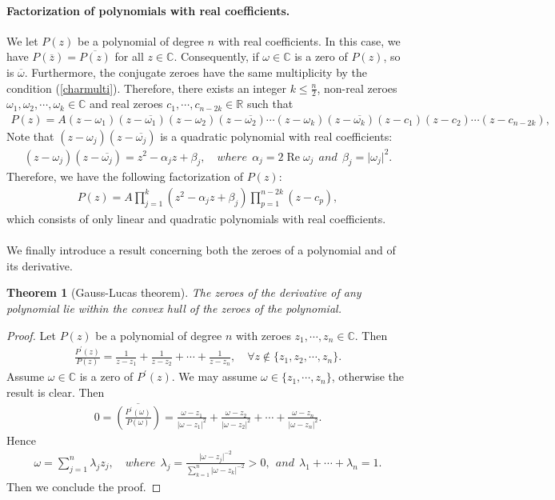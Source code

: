 \documentclass{article}
\numberwithin{equation}{section}
\newcommand{\bbC}{\mathbb{C}}
\newcommand{\bbR}{\mathbb{R}}
\newcommand{\ol}{\overline}
\DeclareMathOperator{\re}{Re}
\theoremstyle{plain}
\newtheorem{theorem}{Theorem}[section]
\theoremstyle{definition}
\begin{document}
\paragraph{Factorization of polynomials with real coefficients.} We let $P(z)$ be a polynomial of degree $n$ with real coefficients. In this case, we have $P(\ol{z})=\ol{P(z)}$ for all $z\in\bbC$. Consequently, if $\omega\in\bbC$ is a zero of $P(z)$, so is $\ol{\omega}$. Furthermore, the conjugate zeroes have the same multiplicity by the condition (\ref{charmulti}). Therefore, there exists an integer $k\leq\frac{n}{2}$, non-real zeroes $\omega_1,\omega_2,\cdots,\omega_k\in\bbC$ and real zeroes $c_1,\cdots,c_{n-2k}\in\bbR$ such that
\begin{align*}
	P(z)=A(z-\omega_1)(z-\ol{\omega_1})(z-\omega_2)(z-\ol{\omega_2})\cdots(z-\omega_k)(z-\ol{\omega_k})(z-c_1)(z-c_2)\cdots(z-c_{n-2k}),
\end{align*}
Note that $(z-\omega_j)(z-\ol{\omega_j})$ is a quadratic polynomial with real coefficients:
\begin{align*}
	(z-\omega_j)(z-\ol{\omega_j})=z^2-\alpha_jz+\beta_j,\quad where\ \ \alpha_j=2\re\omega_j\ \ and\ \ \beta_j=\vert\omega_j\vert^2.
\end{align*}
Therefore, we have the following factorization of $P(z)$:
\begin{align*}
	P(z)=A\prod_{j=1}^k(z^2-\alpha_jz+\beta_j)\prod_{p=1}^{n-2k}(z-c_p),
\end{align*}
which consists of only linear and quadratic polynomials with real coefficients.

\paragraph{} We finally introduce a result concerning both the zeroes of a polynomial and of its derivative.

\begin{theorem}[Gauss-Lucas theorem]\label{gausslucas}
The zeroes of the derivative of any polynomial lie within the convex hull of the zeroes of the polynomial.
\end{theorem}
\begin{proof}
Let $P(z)$ be a polynomial of degree $n$ with zeroes $z_1,\cdots,z_n\in\bbC$. Then
\begin{align*}
	\frac{P^\prime(z)}{P(z)}=\frac{1}{z-z_1}+\frac{1}{z-z_2}+\cdots+\frac{1}{z-z_n},\quad\forall z\notin\{z_1,z_2,\cdots,z_n\}.
\end{align*}
Assume $\omega\in\bbC$ is a zero of $P^\prime(z)$. We may assume $\omega\in\{z_1,\cdots,z_n\}$, otherwise the result is clear. Then
\begin{align*}
	0=\ol{\left(\frac{P^\prime(\omega)}{P(\omega)}\right)}=\frac{\omega-z_1}{\vert \omega-z_1\vert^2}+\frac{\omega-z_2}{\vert \omega-z_2\vert^2}+\cdots+\frac{\omega-z_n}{\vert \omega-z_n\vert^2}.
\end{align*}
Hence
\begin{align*}
	\omega=\sum_{j=1}^n\lambda_j z_j,\quad where\ \ \lambda_j=\frac{\vert\omega-z_j\vert^{-2}}{\sum_{k=1}^n\vert\omega-z_k\vert^{-2}}>0,\ \ and\ \ \lambda_1+\cdots+\lambda_n=1.
\end{align*}
Then we conclude the proof.
\end{proof}
\end{document}
